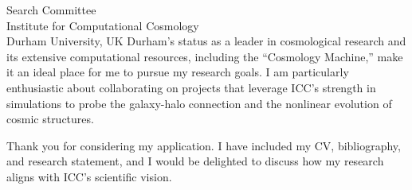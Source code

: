 \documentclass[10pt]{letter}
\begin{document}
\begin{letter}{Search Committee \\ Institute for Computational Cosmology \\ Durham University, UK}
Durham’s status as a leader in cosmological research and its extensive computational resources, including the “Cosmology Machine,” make it an ideal place for me to pursue my research goals. I am particularly enthusiastic about collaborating on projects that leverage ICC’s strength in simulations to probe the galaxy-halo connection and the nonlinear evolution of cosmic structures. 

Thank you for considering my application. I have included my CV, bibliography, and research statement, and I would be delighted to discuss how my research aligns with ICC’s scientific vision.


\end{letter}
\end{document}
